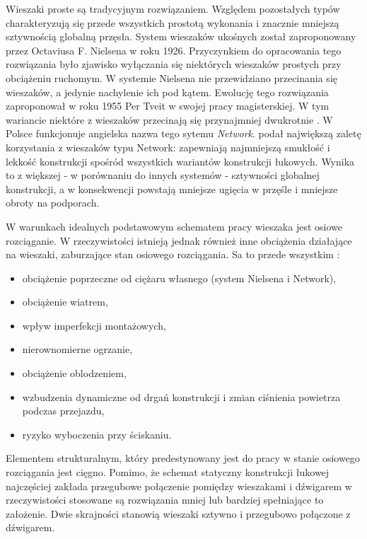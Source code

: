Wieszaki proste są tradycyjnym rozwiązaniem. Względem pozostałych typów charakteryzują się przede wszystkich prostotą wykonania i znacznie mniejszą sztywnością globalną przęsła. System wieszaków ukośnych został zaproponowany przez Octaviusa F. Nielsena w roku 1926. Przyczynkiem do opracowania tego rozwiązania było zjawisko wyłączania się niektórych wieszaków prostych przy obciążeniu ruchomym. W systemie Nielsena nie przewidziano przecinania się wieszaków, a jedynie nachylenie ich pod kątem. Ewolucję tego rozwiązania zaproponował w roku 1955 Per Tveit w swojej pracy magisterskiej. W tym wariancie niektóre z wieszaków przecinają się przynajmniej dwukrotnie \parencite{Tveit2019}. W Polsce funkcjonuje angielska nazwa tego sytemu \textit{Network}. \cite{Tveit2019} podał największą zaletę korzystania z wieszaków typu Network: zapewniają najmniejszą smukłość i lekkość konstrukcji spośród wszystkich wariantów konstrukcji łukowych. Wynika to z większej - w porównaniu do innych systemów - sztywności globalnej konstrukcji, a w konsekwencji powstają mniejsze ugięcia w przęśle i mniejsze obroty na podporach.

W warunkach idealnych podstawowym schematem pracy wieszaka jest osiowe rozciąganie. W rzeczywistości istnieją jednak również inne obciążenia działające na wieszaki, zaburzające stan osiowego rozciągania. Sa to przede wszystkim \parencite{Zobel2015}:
\begin{itemize}[noitemsep]
	\item obciążenie poprzeczne od ciężaru własnego (system Nielsena i Network),
	\item obciążenie wiatrem,
	\item wpływ imperfekcji montażowych,
	\item nierownomierne ogrzanie,
	\item obciążenie oblodzeniem,
	\item wzbudzenia dynamiczne od drgań konstrukcji i zmian ciśnienia powietrza podczas przejazdu,
	\item ryzyko wyboczenia przy ściskaniu.
\end{itemize}

Elementem strukturalnym, który predestynowany jest do pracy w stanie osiowego rozciągania jest cięgno. Pomimo, że schemat statyczny konstrukcji łukowej najczęściej zakłada przegubowe połączenie pomiędzy wieszakami i dźwigarem w rzeczywistości stosowane są rozwiązania mniej lub bardziej spełniające to założenie. Dwie skrajności stanowią wieszaki sztywno i przegubowo połączone z dźwigarem. 


